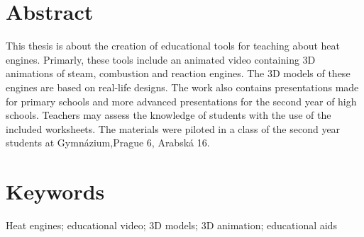\section*{Abstract}
{This thesis is about the creation of educational tools for teaching about heat engines. Primarly, these tools include an animated video containing 3D animations of steam, combustion and reaction engines. The 3D models of these engines are based on real-life designs. The work also contains presentations made for primary schools and more advanced presentations for the second year of high schools. Teachers may assess the knowledge of students with the use of the included worksheets. The materials were piloted in a class of the second year students at Gymnázium,Prague 6, Arabská 16.}

\section*{Keywords}
{Heat engines; educational video; 3D models; 3D animation; educational aids}

\newpage

\tableofcontents


\newpage
\pagestyle{plain}

